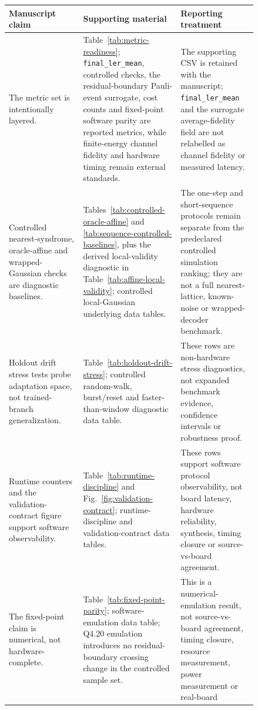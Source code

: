 \documentclass[11pt]{article}
\newcommand{\softwarehil}{controlled simulation}
\newcommand{\finalLER}{\texttt{final\_ler\_mean}}
\begin{document}
\begin{table}[htbp]
\centering
\small
\begin{tabular}{@{}>{\raggedright\arraybackslash}p{0.27\linewidth}>{\raggedright\arraybackslash}p{0.28\linewidth}>{\raggedright\arraybackslash}p{0.29\linewidth}@{}}
\toprule
Manuscript claim & Supporting material & Reporting treatment \\
\midrule
The metric set is intentionally layered. & Table~\ref{tab:metric-readiness};
\finalLER{}, controlled checks, the residual-boundary Pauli-event surrogate,
cost counts and fixed-point software parity are reported metrics, while
finite-energy channel fidelity and hardware timing remain external standards. &
The supporting CSV is retained with the manuscript; \finalLER{} and the surrogate
average-fidelity field are not relabelled as channel fidelity or measured
latency. \\
\addlinespace
Controlled nearest-syndrome, oracle-affine and wrapped-Gaussian checks are diagnostic baselines. &
Tables~\ref{tab:controlled-oracle-affine} and
\ref{tab:sequence-controlled-baselines}, plus the derived local-validity
diagnostic in Table~\ref{tab:affine-local-validity}; controlled local-Gaussian
underlying data tables.
& The one-step and short-sequence protocols remain separate from the predeclared
\softwarehil{} ranking; they are not a full nearest-lattice, known-noise or
wrapped-decoder benchmark. \\
\addlinespace
Holdout drift stress tests probe adaptation space, not trained-branch
generalization. & Table~\ref{tab:holdout-drift-stress}; controlled
random-walk, burst/reset and faster-than-window diagnostic data table. & These
rows are non-hardware stress diagnostics, not expanded benchmark evidence,
confidence intervals or robustness proof. \\
\addlinespace
Runtime counters and the validation-contract figure support software
observability. & Table~\ref{tab:runtime-discipline} and
Fig.~\ref{fig:validation-contract}; runtime-discipline and
validation-contract data tables. & These rows support software protocol
observability, not board latency, hardware reliability, synthesis, timing
closure or source-vs-board agreement. \\
\addlinespace
The fixed-point claim is numerical, not hardware-complete. &
Table~\ref{tab:fixed-point-parity}; software-emulation data table; Q4.20
emulation introduces no residual-boundary crossing change in the controlled
sample set. & This is a numerical-emulation result, not source-vs-board
agreement, timing closure, resource measurement, power measurement or real-board

\end{tabular}
\end{table}
\end{document}

